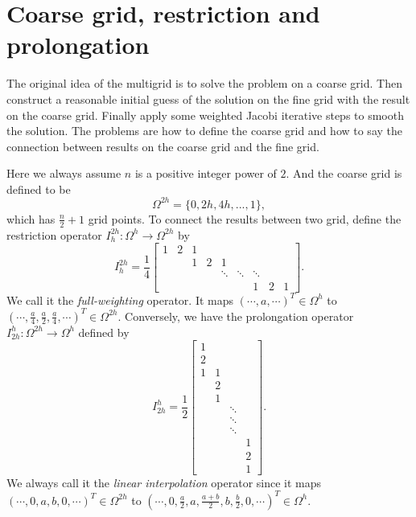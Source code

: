 \documentclass{SBCbookchapter}
\begin{document}
\section{Coarse grid, restriction and prolongation}

The original idea of the multigrid is to solve the problem on a coarse grid. Then construct a reasonable initial guess of the solution on the fine grid with the result on the coarse grid. Finally apply some weighted Jacobi iterative steps to smooth the solution. The problems are how to define the coarse grid and how to say the connection between results on the coarse grid and the fine grid.

Here we always assume $n$ is a positive integer power of $2$. And the coarse grid is defined to be
\begin{equation}
	\Omega^{2h}=\{0,2h,4h,...,1\},
\end{equation}
which has $\frac{n}{2}+1$ grid points. To connect the results between two grid, define the restriction operator $I_h^{2h}:\Omega^h\to \Omega^{2h}$ by
\begin{equation}
	I_h^{2h}=\frac{1}{4}\begin{bmatrix}
		1 & 2 & 1\\
		  &   & 1 & 2 & 1 \\
		  &   &   &   & \ddots & \ddots & \ddots\\
		  &   &   &   &        &        & 1 & 2 & 1
	\end{bmatrix}.
\end{equation}
We call it the \textit{full-weighting} operator. It maps $(\cdots,a,\cdots)^T\in\Omega^h$ to $(\cdots,\frac{a}{4},\frac{a}{2},\frac{a}{4},\cdots)^T\in\Omega^{2h}$. Conversely, we have the prolongation operator $I_{2h}^h:\Omega^{2h}\to \Omega^h$ defined by
\begin{equation}
	I_{2h}^{h}=\frac{1}{2}\begin{bmatrix}
		1\\
		2\\
		1 & 1\\
		  & 2\\
		  & 1\\
		  &  & \ddots\\
		  &  & \ddots\\
		  &  & \ddots\\
		  &  &        & 1\\
		  &  &        & 2\\
		  &  &        & 1
	\end{bmatrix}.
\end{equation}
We always call it the \textit{linear interpolation} operator since it maps $(\cdots,0,a,b,0,\cdots)^T\in\Omega^{2h}$ to $(\cdots,0,\frac{a}{2},a,\frac{a+b}{2},b,\frac{b}{2},0,\cdots)^T\in\Omega^{h}$.
\end{document}
